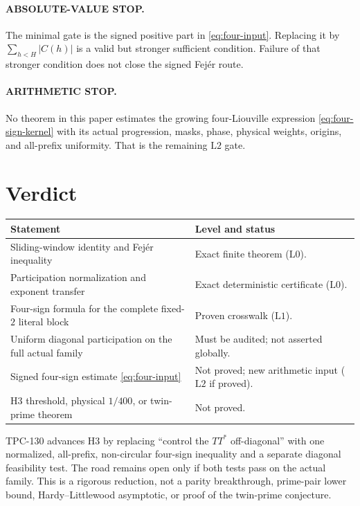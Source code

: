 \documentclass[11pt]{article}
\theoremstyle{definition}
\theoremstyle{remark}
\newcommand{\Lzero}{\mathrm{L0}}
\newcommand{\Lone}{\mathrm{L1}}
\newcommand{\Ltwo}{\mathrm{L2}}
\begin{document}
\paragraph{ABSOLUTE-VALUE STOP.}
The minimal gate is the signed positive part in
\eqref{eq:four-input}.  Replacing it by
\(\sum_{h<H}|C(h)|\) is a valid but stronger sufficient condition.
Failure of that stronger condition does not close the signed
Fej\'er route.

\paragraph{ARITHMETIC STOP.}
No theorem in this paper estimates the growing four-Liouville
expression \eqref{eq:four-sign-kernel} with its actual progression,
masks, phase, physical weights, origins, and all-prefix uniformity.
That is the remaining \(\Ltwo\) gate.

\section{Verdict}

\begin{center}
\small
\begin{tabularx}{\textwidth}{@{}p{}X@{}}
\toprule
Statement & Level and status\\
\midrule
Sliding-window identity and Fej\'er inequality
& Exact finite theorem (\(\Lzero\)).\\
Participation normalization and exponent transfer
& Exact deterministic certificate (\(\Lzero\)).\\
Four-sign formula for the complete fixed-\(2\) literal block
& Proven crosswalk (\(\Lone\)).\\
Uniform diagonal participation on the full actual family
& Must be audited; not asserted globally.\\
Signed four-sign estimate \eqref{eq:four-input}
& Not proved; new arithmetic input (\(\Ltwo\) if proved).\\
H3 threshold, physical \(1/400\), or twin-prime theorem
& Not proved.\\
\bottomrule
\end{tabularx}
\end{center}

TPC-130 advances H3 by replacing ``control the \(TT^*\)
off-diagonal'' with one normalized, all-prefix, non-circular
four-sign inequality and a separate diagonal feasibility test.  The
road remains open only if both tests pass on the actual family.
This is a rigorous reduction, not a parity breakthrough, prime-pair
lower bound, Hardy--Littlewood asymptotic, or proof of the twin-prime
conjecture.

\begingroup
\footnotesize
\raggedright


\endgroup
\end{document}
